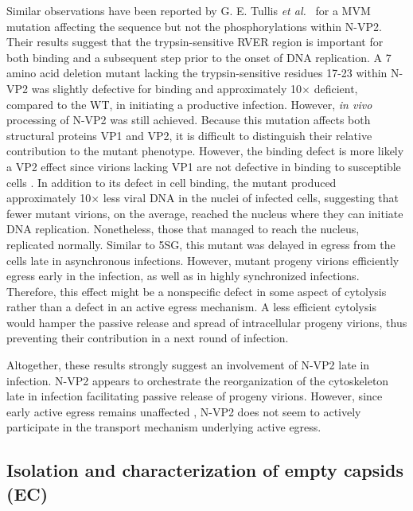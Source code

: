 Similar observations have been reported by G. E. Tullis \textit{et al.}~\cite{pmid1448928} for a MVM mutation affecting the sequence but not the phosphorylations within N-VP2. Their results suggest that the trypsin-sensitive RVER region is important for both binding and a subsequent step prior to the onset of DNA replication. A 7 amino acid deletion mutant lacking the trypsin-sensitive residues 17-23 within N-VP2 was slightly defective for binding and approximately 10$\times$ deficient, compared to the WT, in initiating a productive infection. However, \textit{in vivo} processing of N-VP2 was still achieved. Because this mutation affects both structural proteins VP1 and VP2, it is difficult to distinguish their relative contribution to the mutant phenotype. However, the binding defect is more likely a VP2 effect since virions lacking VP1 are not defective in binding to susceptible cells \cite{pmid8416366}. In addition to its defect in cell binding, the mutant produced approximately 10$\times$ less viral DNA in the nuclei of infected cells, suggesting that fewer mutant virions, on the average, reached the nucleus where they can initiate DNA replication. Nonetheless, those that managed to reach the nucleus, replicated normally. Similar to 5SG, this mutant was delayed in egress from the cells late in asynchronous infections. However, mutant progeny virions efficiently egress early in the infection, as well as in highly synchronized infections. Therefore, this effect might be a nonspecific defect in some aspect of cytolysis rather than a defect in an active egress mechanism. A less efficient cytolysis would hamper the passive release and spread of intracellular progeny virions, thus preventing their contribution in a next round of infection.

Altogether, these results strongly suggest an involvement of N-VP2 late in infection. N-VP2 appears to orchestrate the reorganization of the cytoskeleton late in infection facilitating passive release of progeny virions. However, since early active egress remains unaffected \cite{pmid1448928}, N-VP2 does not seem to actively participate in the transport mechanism underlying active egress.        




\subsection{Isolation and characterization of empty capsids (EC)}

